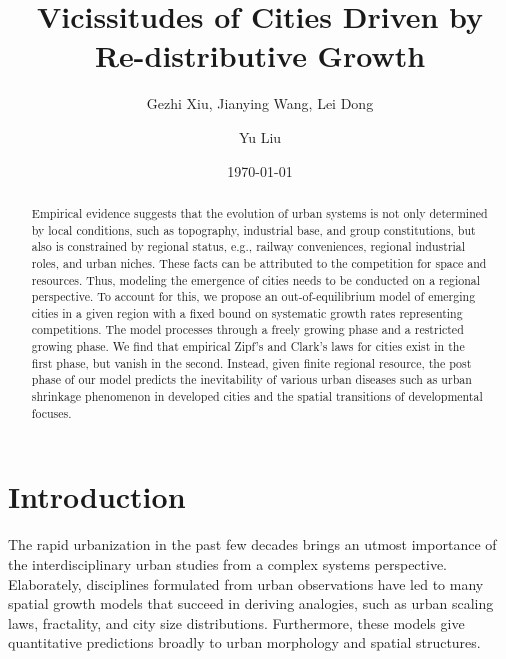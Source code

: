 \documentclass[reprint,unsortedaddress,amsmath,amssymb,aps,prl,showkeys]{revtex4-2}
\begin{document}
\title{Vicissitudes of Cities Driven by Re-distributive Growth}
\author{Gezhi Xiu, Jianying Wang, Lei Dong}
\author{Yu Liu}
\date{\today}

\begin{abstract}
    Empirical evidence suggests that the evolution of urban systems is not only determined by local conditions, such as topography, industrial base, and group constitutions, but also is constrained by regional status, e.g., railway conveniences, regional industrial roles, and urban niches. These facts can be attributed to the competition for space and resources. Thus, modeling the emergence of cities needs to be conducted on a regional perspective. To account for this, we propose an out-of-equilibrium model of emerging cities in a given region with a fixed bound on systematic growth rates representing competitions. The model processes through a freely growing phase and a restricted growing phase. We find that empirical Zipf's and Clark's laws for cities exist in the first phase, but vanish in the second. Instead, given finite regional resource, the post phase of our model predicts the inevitability of various urban diseases such as urban shrinkage phenomenon in developed cities and the spatial transitions of developmental focuses. 
\end{abstract}
\maketitle
\section{Introduction}

The rapid urbanization in the past few decades brings an utmost importance of the
interdisciplinary urban studies from a complex systems perspective. Elaborately, disciplines formulated from urban observations have led to many spatial growth models that succeed in deriving analogies\cite{Li2016}, such as urban scaling laws\cite{court2013origins}, fractality\cite{batty1994fractal,batty2007cities}, and city size distributions\cite{zipf1949human}. Furthermore, these models give quantitative predictions broadly to urban morphology and spatial structures\cite{anas1998urban}. 
\end{document}
